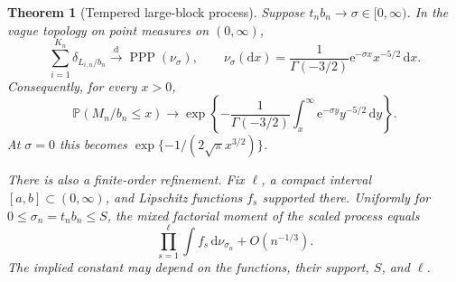 \documentclass[11pt]{article}
\newtheorem{theorem}{Theorem}[section]
\theoremstyle{remark}\newtheorem{remark}[theorem]{Remark}
\theoremstyle{definition}\newtheorem{definition}[theorem]{Definition}
\newcommand{\dd}{\mathrm d}
\newcommand{\e}{\mathrm e}
\newcommand{\Prob}{\mathbb P}
\newcommand{\dto}{\xrightarrow{\mathrm d}}
\DeclareMathOperator{\PPP}{PPP}
\begin{document}
\begin{theorem}[Tempered large-block process]\label{tss:sc:thm:point}
Suppose $t_nb_n\to\sigma\in[0,\infty)$. In the vague topology on point measures on $(0,\infty)$,
\begin{equation}\label{tss:sc:eq:PPP}
 \sum_{i=1}^{K_n}\delta_{L_{i,n}/b_n}
 \dto\PPP(\nu_\sigma),\qquad
 \nu_\sigma(\dd x)=\frac1{\Gamma(-3/2)}\e^{-\sigma x}x^{-5/2}\,\dd x.
\end{equation}
Consequently, for every $x>0$,
\begin{equation}\label{tss:sc:eq:maxcdf}
 \boxed{\displaystyle
 \Prob(M_n/b_n\leq x)\longrightarrow
 \exp\left\{-\frac1{\Gamma(-3/2)}
             \int_x^\infty\e^{-\sigma y}y^{-5/2}\,\dd y\right\}.}
\end{equation}
At $\sigma=0$ this becomes $\exp\{-1/(2\sqrt\pi x^{3/2})\}$.

There is also a finite-order refinement. Fix $\ell$, a compact interval $[a,b]\subset(0,\infty)$, and Lipschitz functions $f_s$ supported there. Uniformly for $0\leq\sigma_n=t_nb_n\leq S$, the mixed factorial moment of the scaled process equals
\begin{equation}\label{tss:sc:eq:factorialrate}
 \prod_{s=1}^\ell\int f_s\,\dd\nu_{\sigma_n}+O(n^{-1/3}).
\end{equation}
The implied constant may depend on the functions, their support, $S$, and $\ell$.
\end{theorem}
\end{document}
